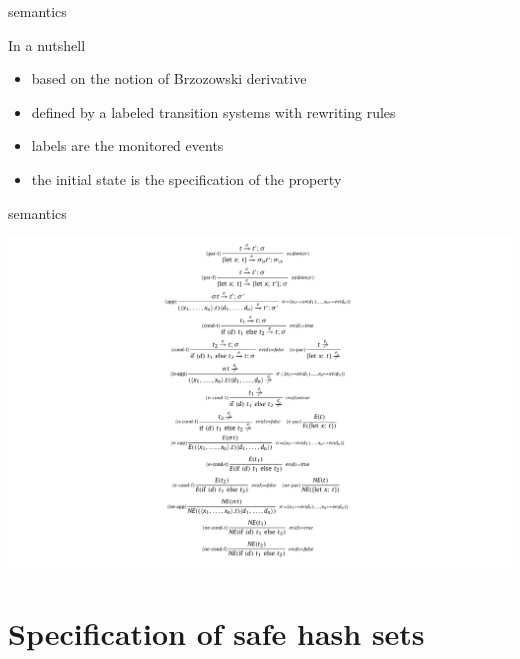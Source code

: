 \documentclass[10pt,usenames,dvipsnames]{beamer}
\begin{document}

\begin{frame}{\rml semantics}
  \begin{block}{In a nutshell}
    \begin{itemize}
    \item based on the notion of Brzozowski derivative 
    \item defined by a labeled transition systems with rewriting rules
    \item labels are the monitored events
    \item the initial state is the specification of the property
    \end{itemize}
  \end{block}
\end{frame}


\begin{frame}{\rml semantics}
  \begin{center}
    \includegraphics[keepaspectratio,height=0.85\textheight]{images/semantics}
  \end{center}
\end{frame}


\section{Specification of safe hash sets}
\end{document}
